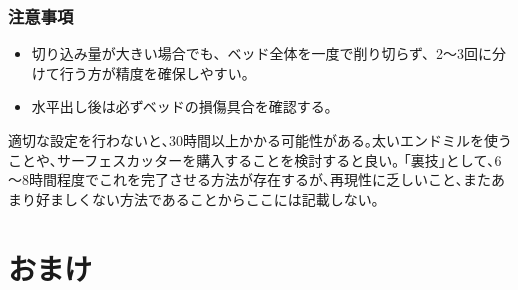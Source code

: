 \documentclass[uplatex,dvipdfmx]{ujarticle}
\begin{document}
\subsubsection*{注意事項}
\begin{itemize}
    \item 切り込み量が大きい場合でも、ベッド全体を一度で削り切らず、2～3回に分けて行う方が精度を確保しやすい。
    \item 水平出し後は必ずベッドの損傷具合を確認する｡
\end{itemize}
適切な設定を行わないと､30時間以上かかる可能性がある｡太いエンドミルを使うことや､サーフェスカッターを購入することを検討すると良い｡
｢裏技｣として､6～8時間程度でこれを完了させる方法が存在するが､再現性に乏しいこと､またあまり好ましくない方法であることからここには記載しない｡

\section{おまけ}
\end{document}
